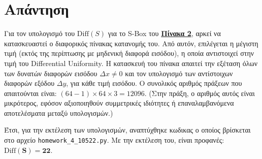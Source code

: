 \documentclass[12pt]{article}
\begin{document}
\section*{Απάντηση}

Για τον υπολογισμό του \( \mathrm{Diff}(S) \) για το S-Box του 
\textbf{\protect\hyperref[πίνακας 2]{Πίνακα 2}}, αρκεί να κατασκευαστεί ο διαφορικός 
πίνακας κατανομής του. Από αυτόν, επιλέγεται η μέγιστη τιμή (εκτός της περίπτωσης με 
μηδενική διαφορά εισόδου), η οποία αντιστοιχεί στην τιμή του Differential Uniformity.
\newline
\newline
Η κατασκευή του πίνακα απαιτεί την εξέταση όλων των δυνατών διαφορών εισόδου \( \Delta x 
\neq 0 \) και τον υπολογισμό των αντίστοιχων διαφορών εξόδου \( \Delta y \), για κάθε τιμή 
εισόδου. Ο συνολικός αριθμός πράξεων που απαιτούνται είναι: \( (64 - 1) \times 64 \times 3 
= 12096 \). (Στην πράξη, ο αριθμός αυτός είναι μικρότερος, εφόσον αξιοποιηθούν συμμετρικές ιδιότητες ή επαναλαμβανόμενα αποτελέσματα μεταξύ υπολογισμών.)
\newline
\newline

Έτσι, για την εκτέλεση των υπολογισμών, αναπτύχθηκε κωδικας ο οποίος βρίσκεται στο αρχείο \texttt{homework\_4\_10522.py}.
\newline
\newline
Με την εκτέλεση του, είναι προφανές: \( \mathbf{\mathrm{Diff}(S) = 22} \).


\hfill \blacksquare
\end{document}
